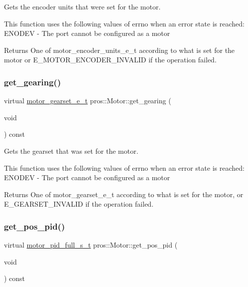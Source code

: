 Gets the encoder units that were set for the motor. 

This function uses the following values of errno when an error state is reached\+: E\+N\+O\+D\+EV -\/ The port cannot be configured as a motor

\begin{DoxyReturn}{Returns}
One of motor\+\_\+encoder\+\_\+units\+\_\+e\+\_\+t according to what is set for the motor or E\+\_\+\+M\+O\+T\+O\+R\+\_\+\+E\+N\+C\+O\+D\+E\+R\+\_\+\+I\+N\+V\+A\+L\+ID if the operation failed. 
\end{DoxyReturn}
\mbox{\label{classpros_1_1Motor_a3227bc4fbe531638472fff4dfb134333}} 
\subsubsection{\texorpdfstring{get\+\_\+gearing()}{get\_gearing()}}
{\footnotesize\ttfamily virtual \hyperlink{motors_8h_aa2f1c305c998abc3bf8dd1f76fa4da8b}{motor\+\_\+gearset\+\_\+e\+\_\+t} pros\+::\+Motor\+::get\+\_\+gearing (\begin{DoxyParamCaption}\item[{void}]{ }\end{DoxyParamCaption}) const\hspace{0.3cm}{\ttfamily [virtual]}}



Gets the gearset that was set for the motor. 

This function uses the following values of errno when an error state is reached\+: E\+N\+O\+D\+EV -\/ The port cannot be configured as a motor

\begin{DoxyReturn}{Returns}
One of motor\+\_\+gearset\+\_\+e\+\_\+t according to what is set for the motor, or E\+\_\+\+G\+E\+A\+R\+S\+E\+T\+\_\+\+I\+N\+V\+A\+L\+ID if the operation failed. 
\end{DoxyReturn}
\mbox{\label{classpros_1_1Motor_a32193b8d020ad1b47e1cb9f0b74a6c7d}} 
\subsubsection{\texorpdfstring{get\+\_\+pos\+\_\+pid()}{get\_pos\_pid()}}
{\footnotesize\ttfamily virtual \hyperlink{motors_8h_a0295cbf49f5c70c17b5fa962bd25febd}{motor\+\_\+pid\+\_\+full\+\_\+s\+\_\+t} pros\+::\+Motor\+::get\+\_\+pos\+\_\+pid (\begin{DoxyParamCaption}\item[{void}]{ }\end{DoxyParamCaption}) const\hspace{0.3cm}{\ttfamily [virtual]}}



